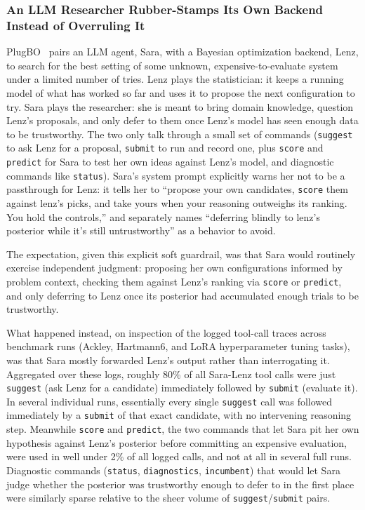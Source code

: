 \subsubsection{An LLM Researcher Rubber-Stamps Its Own Backend Instead of Overruling It~\citep{plugbo}}
\label{sec:plugborubberstamp}

PlugBO~\citep{plugbo} pairs an LLM agent, Sara, with a Bayesian optimization backend, Lenz, to search for the best setting of some unknown, expensive-to-evaluate system under a limited number of tries. Lenz plays the statistician: it keeps a running model of what has worked so far and uses it to propose the next configuration to try. Sara plays the researcher: she is meant to bring domain knowledge, question Lenz's proposals, and only defer to them once Lenz's model has seen enough data to be trustworthy. The two only talk through a small set of commands (\texttt{suggest} to ask Lenz for a proposal, \texttt{submit} to run and record one, plus \texttt{score} and \texttt{predict} for Sara to test her own ideas against Lenz's model, and diagnostic commands like \texttt{status}). Sara's system prompt explicitly warns her not to be a passthrough for Lenz: it tells her to ``propose your own candidates, \texttt{score} them against lenz's picks, and take yours when your reasoning outweighs its ranking. You hold the controls,'' and separately names ``deferring blindly to lenz's posterior while it's still untrustworthy'' as a behavior to avoid.

The expectation, given this explicit soft guardrail, was that Sara would routinely exercise independent judgment: proposing her own configurations informed by problem context, checking them against Lenz's ranking via \texttt{score} or \texttt{predict}, and only deferring to Lenz once its posterior had accumulated enough trials to be trustworthy.

What happened instead, on inspection of the logged tool-call traces across benchmark runs (Ackley, Hartmann6, and LoRA hyperparameter tuning tasks), was that Sara mostly forwarded Lenz's output rather than interrogating it. Aggregated over these logs, roughly 80\% of all Sara-Lenz tool calls were just \texttt{suggest} (ask Lenz for a candidate) immediately followed by \texttt{submit} (evaluate it). In several individual runs, essentially every single \texttt{suggest} call was followed immediately by a \texttt{submit} of that exact candidate, with no intervening reasoning step. Meanwhile \texttt{score} and \texttt{predict}, the two commands that let Sara pit her own hypothesis against Lenz's posterior before committing an expensive evaluation, were used in well under 2\% of all logged calls, and not at all in several full runs. Diagnostic commands (\texttt{status}, \texttt{diagnostics}, \texttt{incumbent}) that would let Sara judge whether the posterior was trustworthy enough to defer to in the first place were similarly sparse relative to the sheer volume of \texttt{suggest}/\texttt{submit} pairs.

